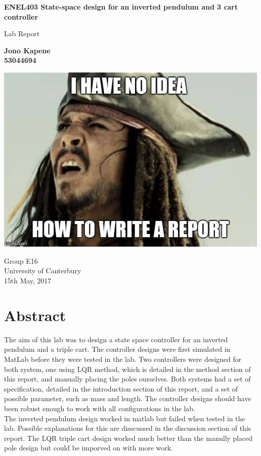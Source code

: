 \documentclass[a4paper,12pt]{article}
\begin{document}
	\begin{titlepage}
    		\begin{center}
        		\vspace*{1cm}
        
        		\textbf{ENEL403  State-space design for an inverted pendulum and 3 cart controller}
        
        		\vspace{0.5cm}
        		Lab Report
        
        		\vspace{1.5cm}
        
        		\textbf{Jono Kapene \\ 53044694}
        
        		\vfill
        		\includegraphics[scale=0.6]{pmeme.jpg}
        		\vspace{0.8cm}
        
        		Group E16\\
        		University of Canterbury\\
        		15th May, 2017
        
    \end{center}
\end{titlepage}
	\clearpage
	
\section{Abstract}
The aim of this lab was to design a state space controller for an inverted pendulum and a triple cart. The controller designs were first simulated in MatLab before they were tested in the lab. Two controllers were designed for both system, one using LQR method, which is detailed in the method section of this report, and manually placing the poles ourselves. Both systems had a set of specification, detailed in the introduction section of this report, and a set of possible parameter, such as mass and length. The controller designs should have been robust enough to work with all configurations in the lab.\\
The inverted pendulum design worked in matlab but failed when tested in the lab. Possible explanations for this are disscussed in the discussion section of this report. The LQR triple cart design worked much better than the manully placed pole design but could be imporved on with more work.
\end{document}
